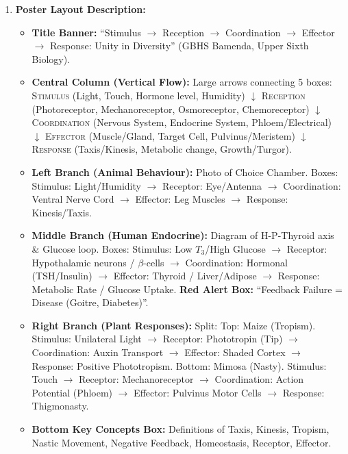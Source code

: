 \documentclass[11pt]{article}
\begin{document}
\begin{enumerate}
    \item \textbf{Poster Layout Description:}
    \begin{itemize}
        \item \textbf{Title Banner:} ``Stimulus $\rightarrow$ Reception $\rightarrow$ Coordination $\rightarrow$ Effector $\rightarrow$ Response: Unity in Diversity'' (GBHS Bamenda, Upper Sixth Biology).
        \item \textbf{Central Column (Vertical Flow):} Large arrows connecting 5 boxes: \textsc{Stimulus} (Light, Touch, Hormone level, Humidity) $\downarrow$ \textsc{Reception} (Photoreceptor, Mechanoreceptor, Osmoreceptor, Chemoreceptor) $\downarrow$ \textsc{Coordination} (Nervous System, Endocrine System, Phloem/Electrical) $\downarrow$ \textsc{Effector} (Muscle/Gland, Target Cell, Pulvinus/Meristem) $\downarrow$ \textsc{Response} (Taxis/Kinesis, Metabolic change, Growth/Turgor).
        \item \textbf{Left Branch (Animal Behaviour):} Photo of Choice Chamber. Boxes: Stimulus: Light/Humidity $\rightarrow$ Receptor: Eye/Antenna $\rightarrow$ Coordination: Ventral Nerve Cord $\rightarrow$ Effector: Leg Muscles $\rightarrow$ Response: Kinesis/Taxis.
        \item \textbf{Middle Branch (Human Endocrine):} Diagram of H-P-Thyroid axis \& Glucose loop. Boxes: Stimulus: Low $T_3$/High Glucose $\rightarrow$ Receptor: Hypothalamic neurons / $\beta$-cells $\rightarrow$ Coordination: Hormonal (TSH/Insulin) $\rightarrow$ Effector: Thyroid / Liver/Adipose $\rightarrow$ Response: Metabolic Rate / Glucose Uptake. \textbf{Red Alert Box:} ``Feedback Failure = Disease (Goitre, Diabetes)''.
        \item \textbf{Right Branch (Plant Responses):} Split: Top: Maize (Tropism). Stimulus: Unilateral Light $\rightarrow$ Receptor: Phototropin (Tip) $\rightarrow$ Coordination: Auxin Transport $\rightarrow$ Effector: Shaded Cortex $\rightarrow$ Response: Positive Phototropism. Bottom: Mimosa (Nasty). Stimulus: Touch $\rightarrow$ Receptor: Mechanoreceptor $\rightarrow$ Coordination: Action Potential (Phloem) $\rightarrow$ Effector: Pulvinus Motor Cells $\rightarrow$ Response: Thigmonasty.
        \item \textbf{Bottom Key Concepts Box:} Definitions of Taxis, Kinesis, Tropism, Nastic Movement, Negative Feedback, Homeostasis, Receptor, Effector.
    \end{itemize}


\end{enumerate}
\end{document}
